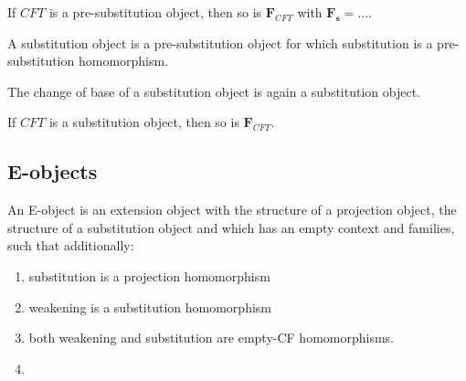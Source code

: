 \begin{lem}
If $CFT$ is a pre-substitution object, then so is $\mathbf{F}_{CFT}$ with
$\mathbf{F}_{\mathbf{s}}=...$.
\end{lem}

\begin{defn}
A substitution object is a pre-substitution object for which substitution is
a pre-substitution homomorphism.
\end{defn}

\begin{cor}
The change of base of a substitution object is again a substitution object.
\end{cor}

\begin{cor}
If $CFT$ is a substitution object, then so is $\mathbf{F}_{CFT}$.
\end{cor}

\subsection{E-objects}
\begin{defn}
An E-object is an extension object with the structure of a projection object,
the structure of a substitution object and which has an empty context and families,
such that additionally:
\begin{enumerate}
\item substitution is a projection homomorphism
\item weakening is a substitution homomorphism
\item both weakening and substitution are empty-CF homomorphisms.
\item 
\end{enumerate}
\end{defn}
